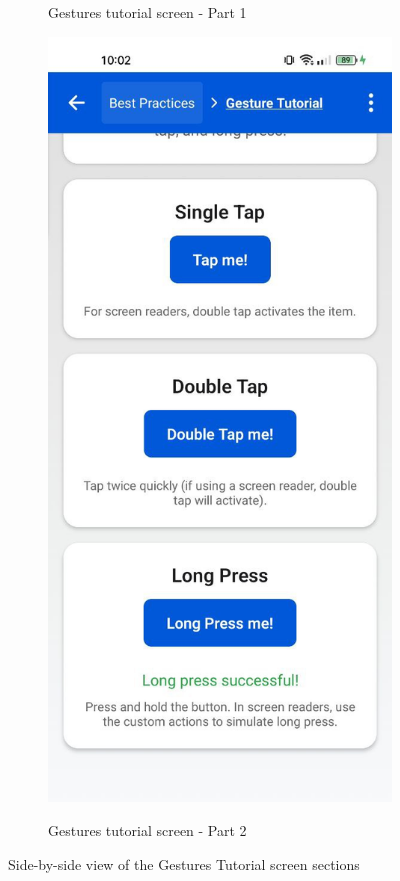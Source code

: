 \begin{figure}[ht]
\begin{subfigure}[b]{0.48\textwidth}
        \caption{Gestures tutorial screen - Part 1}
        \label{fig:gestures-left}
    \end{subfigure}
    \hfill
    \begin{subfigure}[b]{0.48\textwidth}
        \centering
        \includegraphics[width=\linewidth, alt={Second part of the Gestures Tutorial Screen}]{img/gestures2.jpg}
        \caption{Gestures tutorial screen - Part 2}
        \label{fig:gestures-right}
    \end{subfigure}
    \caption{Side-by-side view of the Gestures Tutorial screen sections}
    \label{fig:gestures_screens_sidebyside}
\end{figure}


